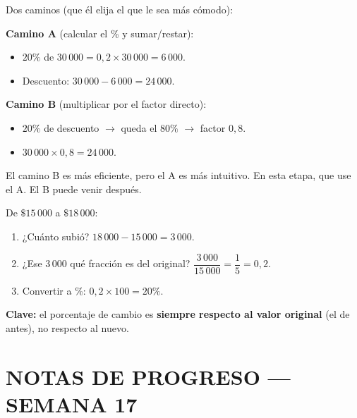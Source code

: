\documentclass[11pt,a4paper]{article}
\begin{document}
\begin{tcolorbox}[guia-tutor, title={\color{tutormorado} SI NO PUEDE CALCULAR UN \% DE AUMENTO/DESCUENTO}]
Dos caminos (que él elija el que le sea más cómodo):

\textbf{Camino A} (calcular el \% y sumar/restar):
\begin{itemize}[nosep]
  \item $20\%$ de $30\,000 = 0{,}2 \times 30\,000 = 6\,000$.
  \item Descuento: $30\,000 - 6\,000 = 24\,000$.
\end{itemize}

\textbf{Camino B} (multiplicar por el factor directo):
\begin{itemize}[nosep]
  \item $20\%$ de descuento $\to$ queda el $80\%$ $\to$ factor $0{,}8$.
  \item $30\,000 \times 0{,}8 = 24\,000$.
\end{itemize}

El camino B es más eficiente, pero el A es más intuitivo. En esta etapa, que use el A. El B puede venir después.
\end{tcolorbox}

\begin{tcolorbox}[guia-tutor, title={\color{tutormorado} SI NO PUEDE CALCULAR QUÉ \% REPRESENTA UN CAMBIO}]
De $\$15\,000$ a $\$18\,000$:
\begin{enumerate}[nosep]
  \item ¿Cuánto subió? $18\,000 - 15\,000 = 3\,000$.
  \item ¿Ese $3\,000$ qué fracción es del original? $\dfrac{3\,000}{15\,000} = \dfrac{1}{5} = 0{,}2$.
  \item Convertir a \%: $0{,}2 \times 100 = 20\%$.
\end{enumerate}

\textbf{Clave:} el porcentaje de cambio es \textbf{siempre respecto al valor original} (el de antes), no respecto al nuevo.
\end{tcolorbox}

\newpage

\section*{NOTAS DE PROGRESO --- SEMANA 17}
\end{document}
